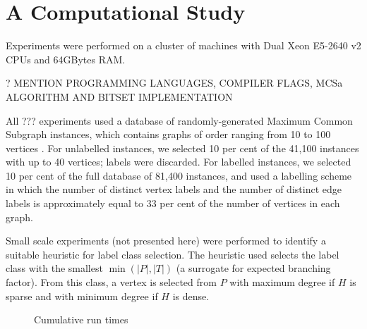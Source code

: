 \documentclass[letterpaper]{article}
\begin{document}
\section{A Computational Study}

Experiments were performed on a cluster of machines with Dual Xeon E5-2640
v2 CPUs and 64GBytes RAM.

? MENTION PROGRAMMING LANGUAGES, COMPILER FLAGS, MCSa ALGORITHM AND
BITSET IMPLEMENTATION

All ??? experiments used a database of
randomly-generated Maximum Common Subgraph instances, which contains graphs of
order ranging from 10 to 100 vertices
\cite{DBLP:journals/prl/SantoFSV03,DBLP:journals/jgaa/ConteFV07}.  For
unlabelled instances, we selected 10 per cent of the 41,100 instances with up
to 40 vertices; labels were discarded. For labelled instances, we selected 10
per cent of the full database of 81,400 instances, and used a labelling scheme
in which the number of distinct vertex labels and the number of distinct edge
labels is approximately equal to 33 per cent of the number of vertices in each
graph.

Small scale experiments (not presented here) were performed to identify a
suitable heuristic for label class selection. The heuristic used selects the
label class  with the smallest $\min(|P|,|T|)$ (a surrogate for expected
branching factor). From this class, a vertex is selected from $P$ with maximum
degree if $H$ is sparse and with minimum degree if $H$ is dense. 

\begin{figure}[h]
    \centering

    \caption{Cumulative run times}\label{figure:mcs-cumulative}
\end{figure}
\end{document}
